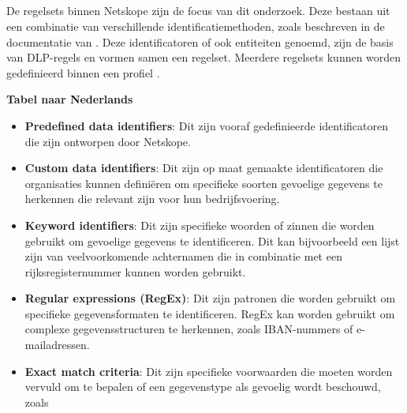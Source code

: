 \subsection{}
\label{subsec:regelsets-literatuurstudie}

De regelsets binnen Netskope zijn de focus van dit onderzoek. Deze bestaan uit een combinatie van verschillende identificatiemethoden, zoals beschreven in de documentatie van \textcite{Netskope2025DLP}. 
Deze identificatoren of ook entiteiten genoemd, zijn de basis van DLP-regels en vormen samen een regelset. 
Meerdere regelsets kunnen worden gedefinieerd binnen een profiel \autocite{Netskope2025Profiles}.



\textbf{Tabel naar Nederlands}

{\small
\begin{itemize}
    \item \textbf{Predefined data identifiers}: Dit zijn vooraf gedefinieerde identificatoren die zijn ontworpen door Netskope.
    \item \textbf{Custom data identifiers}: Dit zijn op maat gemaakte identificatoren die organisaties kunnen definiëren om specifieke soorten gevoelige gegevens te herkennen die relevant zijn voor hun bedrijfsvoering.
    \item \textbf{Keyword identifiers}: Dit zijn specifieke woorden of zinnen die worden gebruikt om gevoelige gegevens te identificeren. Dit kan bijvoorbeeld een lijst zijn van veelvoorkomende achternamen die in combinatie met een rijksregisternummer kunnen worden gebruikt.
    \item \textbf{Regular expressions (RegEx)}: Dit zijn patronen die worden gebruikt om specifieke gegevensformaten te identificeren. RegEx kan worden gebruikt om complexe gegevensstructuren te herkennen, zoals IBAN-nummers of e-mailadressen.
    \item \textbf{Exact match criteria}: Dit zijn specifieke voorwaarden die moeten worden vervuld om te bepalen of een gegevenstype als gevoelig wordt beschouwd, zoals 
\end{itemize}
}


